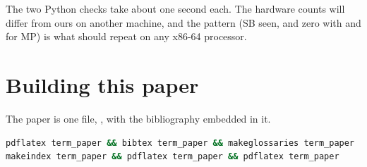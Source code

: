 The two Python checks take about one second each. The hardware counts will differ from ours on another machine, and the pattern (SB  seen, and zero with  and for MP) is what should repeat on any x86-64 processor.

\section*{Building this paper}

The paper is one file, , with the bibliography embedded in it.

\begin{lstlisting}[language=bash]
pdflatex term_paper && bibtex term_paper && makeglossaries term_paper
makeindex term_paper && pdflatex term_paper && pdflatex term_paper
\end{lstlisting}

\cleardoublepage
{}
{}



\glsaddall
\printglossary[title=Glossary]

\printindex


